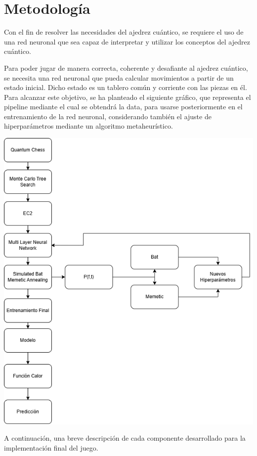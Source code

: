 \section{Metodología}
Con el fin de resolver las necesidades del ajedrez cuántico, se requiere el uso de una red neuronal que sea capaz de interpretar y utilizar los conceptos del ajedrez cuántico.

Para poder jugar de manera correcta, coherente y desafiante al ajedrez cuántico, se necesita una red neuronal que pueda calcular movimientos a partir de un estado inicial. Dicho estado es un tablero común y corriente con las piezas en él. Para alcanzar este objetivo, se ha planteado el siguiente gráfico, que representa el pipeline mediante el cual se obtendrá la data, para usarse posteriormente en el entrenamiento de la red neuronal, considerando también el ajuste de hiperparámetros mediante un algoritmo metaheurístico.

\begin{center}
    \includegraphics[scale=0.4]{Imagenes/metodologia.drawio.png}
\end{center}

A continuación, una breve descripción de cada componente desarrollado para la implementación final del juego.

